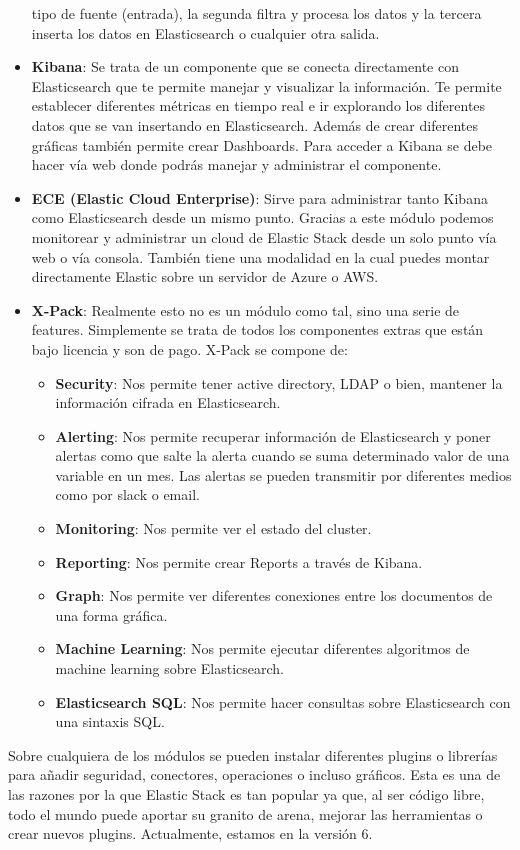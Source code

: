 \begin{itemize}
  tipo de fuente (entrada), la segunda filtra y procesa los datos y la
  tercera inserta los datos en Elasticsearch o cualquier otra salida.
\item \textbf{Kibana}: Se trata de un componente que se conecta
  directamente con Elasticsearch que te permite manejar y visualizar la
  información. Te permite establecer diferentes métricas en tiempo real e
  ir explorando los diferentes datos que se van insertando en
  Elasticsearch. Además de crear diferentes gráficas también permite crear
  Dashboards. Para acceder a Kibana se debe hacer vía web donde podrás
  manejar y administrar el componente.
\item \textbf{ECE (Elastic Cloud Enterprise)}: Sirve para administrar tanto
  Kibana como Elasticsearch desde un mismo punto. Gracias a este módulo
  podemos monitorear y administrar un cloud de Elastic Stack desde un solo
  punto vía web o vía consola. También tiene una modalidad en la cual
  puedes montar directamente Elastic sobre un servidor de Azure o AWS.
\item \textbf{X-Pack}: Realmente esto no es un módulo como tal, sino una
  serie de features. Simplemente se trata de todos los componentes extras
  que están bajo licencia y son de pago. X-Pack se compone de:
\begin{itemize}
\item \textbf{Security}: Nos permite tener active directory, LDAP o bien,
  mantener la información cifrada en Elasticsearch.
\item \textbf{Alerting}: Nos permite recuperar información de Elasticsearch
  y poner alertas como que salte la alerta cuando se suma determinado valor
  de una variable en un mes. Las alertas se pueden transmitir por
  diferentes medios como por slack o email.
\item \textbf{Monitoring}: Nos permite ver el estado del cluster.
\item \textbf{Reporting}: Nos permite crear Reports a través de Kibana.
\item \textbf{Graph}: Nos permite ver diferentes conexiones entre los
  documentos de una forma gráfica.
\item \textbf{Machine Learning}: Nos permite ejecutar diferentes algoritmos
  de machine learning sobre Elasticsearch.
\item\textbf{ Elasticsearch SQL}: Nos permite hacer consultas sobre
  Elasticsearch con una sintaxis SQL.
\end{itemize}
\end{itemize}

Sobre cualquiera de los módulos se pueden instalar diferentes plugins o
librerías para añadir seguridad, conectores, operaciones o incluso
gráficos. Esta es una de las razones por la que Elastic Stack es tan
popular ya que, al ser código libre, todo el mundo puede aportar su granito
de arena, mejorar las herramientas o crear nuevos plugins. Actualmente,
estamos en la versión 6.


